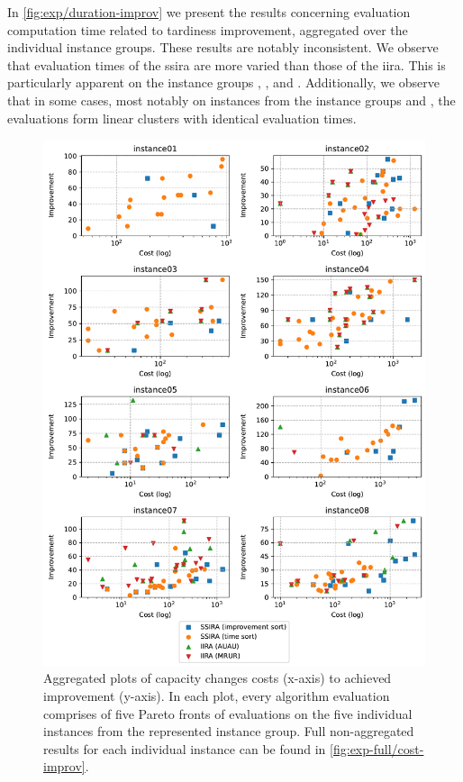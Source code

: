 In \cref{fig:exp/duration-improv} we present the results concerning
evaluation computation time related to tardiness improvement, aggregated over the individual instance groups.
These results are notably inconsistent.
We observe that evaluation times of the \ac{ssira} are more varied than those of the \ac{iira}.
This is particularly apparent on the instance groups , , and .
Additionally, we observe that in some cases,
most notably on instances from the instance groups  and ,
the evaluations form linear clusters with identical evaluation times.

\begin{figure}[p]
    \centering
    \includegraphics[width=\textwidth]{img/exp_aggregated_cost_improv.pdf}
    \caption{
        Aggregated plots of capacity changes costs (x-axis) to achieved improvement (y-axis).
        In each plot, every algorithm evaluation comprises of five Pareto fronts of evaluations
        on the five individual instances from the represented instance group.
        Full non-aggregated results for each individual instance can be found in \cref{fig:exp-full/cost-improv}.
        }
    \label{fig:exp/cost-improv}
\end{figure}

